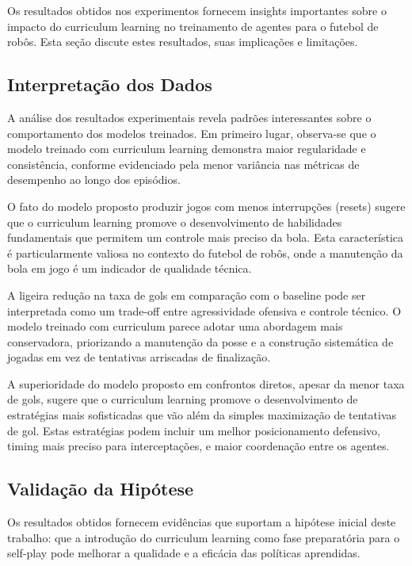 Os resultados obtidos nos experimentos fornecem insights importantes sobre o impacto do curriculum learning no treinamento de agentes para o futebol de robôs. Esta seção discute estes resultados, suas implicações e limitações.

\subsection{Interpretação dos Dados}

A análise dos resultados experimentais revela padrões interessantes sobre o comportamento dos modelos treinados. Em primeiro lugar, observa-se que o modelo treinado com curriculum learning demonstra maior regularidade e consistência, conforme evidenciado pela menor variância nas métricas de desempenho ao longo dos episódios.

O fato do modelo proposto produzir jogos com menos interrupções (resets) sugere que o curriculum learning promove o desenvolvimento de habilidades fundamentais que permitem um controle mais preciso da bola. Esta característica é particularmente valiosa no contexto do futebol de robôs, onde a manutenção da bola em jogo é um indicador de qualidade técnica.

A ligeira redução na taxa de gols em comparação com o baseline pode ser interpretada como um trade-off entre agressividade ofensiva e controle técnico. O modelo treinado com curriculum parece adotar uma abordagem mais conservadora, priorizando a manutenção da posse e a construção sistemática de jogadas em vez de tentativas arriscadas de finalização.

A superioridade do modelo proposto em confrontos diretos, apesar da menor taxa de gols, sugere que o curriculum learning promove o desenvolvimento de estratégias mais sofisticadas que vão além da simples maximização de tentativas de gol. Estas estratégias podem incluir um melhor posicionamento defensivo, timing mais preciso para interceptações, e maior coordenação entre os agentes.

\subsection{Validação da Hipótese}

Os resultados obtidos fornecem evidências que suportam a hipótese inicial deste trabalho: que a introdução do curriculum learning como fase preparatória para o self-play pode melhorar a qualidade e a eficácia das políticas aprendidas.


